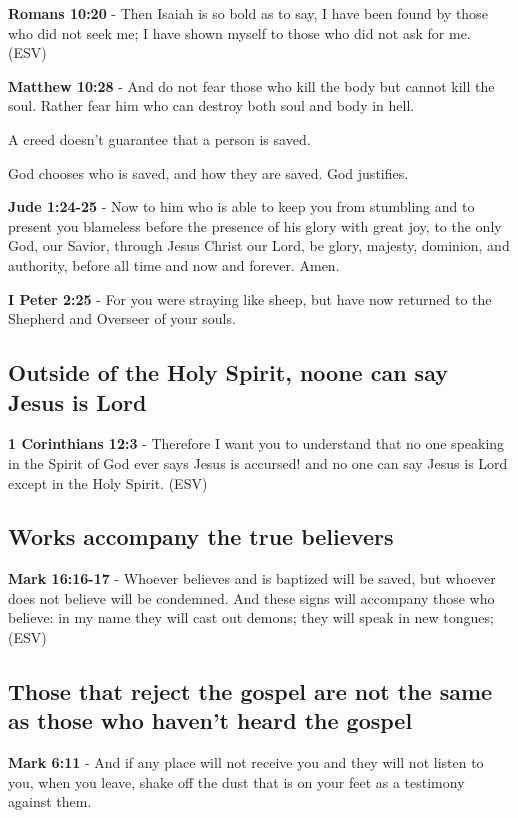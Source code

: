 \documentclass[11pt]{article}
\begin{document}
\textbf{Romans 10:20} - Then Isaiah is so bold as to say, I have been found by those who did not seek me; I have shown myself to those who did not ask for me. (ESV)

\textbf{Matthew 10:28} - And do not fear those who kill the body but cannot kill the soul. Rather fear him who can destroy both soul and body in hell.

A creed doesn't guarantee that a person is saved.

God chooses who is saved, and how they are saved.
God justifies.

\textbf{Jude 1:24-25} - Now to him who is able to keep you from stumbling and to present you blameless before the presence of his glory with great joy, to the only God, our Savior, through Jesus Christ our Lord, be glory, majesty, dominion, and authority, before all time and now and forever. Amen.

\textbf{I Peter 2:25} - For you were straying like sheep, but have now returned to the Shepherd and Overseer of your souls.

\subsection{Outside of the Holy Spirit, noone can say Jesus is Lord}
\label{sec:orgb542ea0}

\textbf{1 Corinthians 12:3} - Therefore I want you to understand that no one speaking in the Spirit of God ever says Jesus is accursed! and no one can say Jesus is Lord except in the Holy Spirit. (ESV)

\subsection{Works accompany the true believers}
\label{sec:org1c4cefe}
\textbf{Mark 16:16-17} - Whoever believes and is baptized will be saved, but whoever does not believe will be condemned. And these signs will accompany those who believe: in my name they will cast out demons; they will speak in new tongues; (ESV)

\subsection{Those that reject the gospel are not the same as those who haven't heard the gospel}
\label{sec:org27407c1}
\textbf{Mark 6:11} - And if any place will not receive you and they will not listen to you, when you leave, shake off the dust that is on your feet as a testimony against them.
\end{document}

